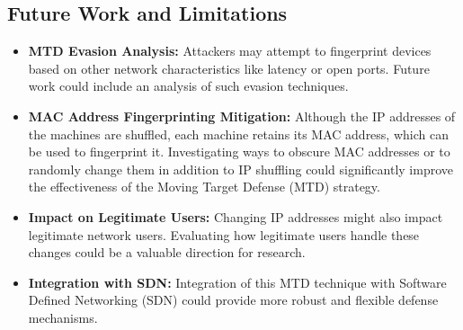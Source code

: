 \subsection{Future Work and Limitations}

\begin{itemize}
\item \textbf{MTD Evasion Analysis:} Attackers may attempt to fingerprint devices based on other network characteristics like latency or open ports. Future work could include an analysis of such evasion techniques.
\item \textbf{MAC Address Fingerprinting Mitigation:} Although the IP addresses of the machines are shuffled, each machine retains its MAC address, which can be used to fingerprint it. Investigating ways to obscure MAC addresses or to randomly change them in addition to IP shuffling could significantly improve the effectiveness of the Moving Target Defense (MTD) strategy.
\item \textbf{Impact on Legitimate Users:} Changing IP addresses might also impact legitimate network users. Evaluating how legitimate users handle these changes could be a valuable direction for research.
\item \textbf{Integration with SDN:} Integration of this MTD technique with Software Defined Networking (SDN) could provide more robust and flexible defense mechanisms.
\end{itemize}